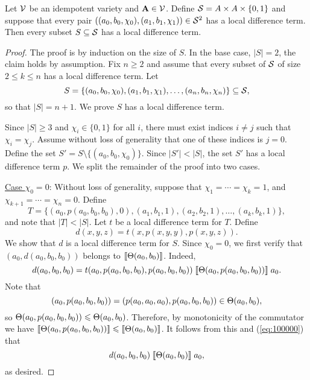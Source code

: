 \begin{thm} %
  \label{thm:local-diff-terms}
  Let $\mathcal{V}$ be an idempotent variety and
  $\mathbf{A} \in \mathcal{V}$. Define
  $\mathcal{S}= A \times A \times \{0,1\}$
  and suppose that every pair
  $((a_0, b_0, \chi_0), (a_1, b_1, \chi_1)) \in \mathcal{S}^2$
  has a local difference term.
  Then every subset $S \subseteq \mathcal{S}$
  has a local difference term.
\end{thm}
\begin{proof}
The proof is by induction on the size of $S$.  In the base case, $|S| = 2$,
the claim holds by assumption.
Fix $n\geq 2$ and assume that every subset of $\mathcal{S}$ of size $2\leq k \leq n$ has a local
difference term. Let
\[
S = \{(a_0, b_0, \chi_0), (a_1, b_1, \chi_1), \dots, (a_{n}, b_{n},\chi_{n})\} \subseteq \mathcal{S},\]
so that $|S| = n+1$.  We prove $S$ has a local difference term.

Since $|S| \geq 3$ and $\chi_i \in \{0,1\}$ for all $i$, there must exist
indices $i\neq j$ such that $\chi_i = \chi_j$. Assume without loss of generality
that one of these indices is $j=0$.  Define
the set
$S' = S \setminus \{(a_0, b_0, \chi_0)\}$.
Since $|S'| < |S|$, the set $S'$ has a local difference term $p$.
We split the remainder of the proof into two cases.

\vskip3mm

\noindent \underline{Case $\chi_0 = 0$}:
Without loss of generality, suppose that $\chi_1 = %
\cdots =\chi_k = 1$,
and $\chi_{k+1} %
= \cdots = \chi_{n} = 0$. Define %
\[T = \{(a_0, p(a_0, b_0, b_0), 0),
(a_1, b_1, 1), (a_2, b_2, 1), 
\dots, (a_k, b_k, 1)\},\] and 
note that $|T| < |S|$.
Let $t$ be a local difference term for $T$.
Define
\[
d(x,y,z) = t(x, p(x,y,y), p(x,y,z)).
\]
We show that $d$ is a local difference term for $S$.
Since $\chi_0 =0$, we first verify that
$(a_0, d(a_0,b_0,b_0))$ belongs to $\llbracket \Theta(a_0,b_0) \rrbracket$.
Indeed,
\begin{equation}
    \label{eq:100000}
  d(a_0,b_0,b_0) =
  t(a_0, p(a_0,b_0,b_0), p(a_0,b_0,b_0))\comr{\Cg(a_0, p(a_0,b_0,b_0))} a_0.
\end{equation}
Note that
\[(a_0, p(a_0,b_0,b_0)) = (p(a_0,a_0,a_0), p(a_0,b_0,b_0)) \in \Theta(a_0, b_0),\]
so $\Theta(a_0, p(a_0,b_0,b_0))\leqslant \Theta(a_0,b_0)$. Therefore,
by monotonicity of the commutator we have
$\llbracket \Theta(a_0, p(a_0,b_0,b_0)) \rrbracket \leqslant \llbracket \Theta(a_0,b_0) \rrbracket$.
It follows from this and (\ref{eq:100000}) that
\[d(a_0,b_0,b_0)\mathrel{\llbracket \Theta(a_0,b_0) \rrbracket} a_0,\]
as desired.


\end{proof}
